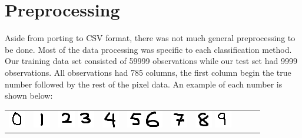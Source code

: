 \documentclass[10pt]{extarticle}
\begin{document}
\section{Preprocessing}

Aside from porting to CSV format, there was not much general preprocessing to be done. Most of the data processing was specific to each classification method. Our training data set consisted of 59999 observations while our test set had 9999 observations. All observations had 785 columns, the first column begin the true number followed by the rest of the pixel data. An example of each number is shown below:
\begin{center}
	\begin{tabular}{c c c c c c c c c c}
		\includegraphics{zero.png} & \includegraphics{one.png} & \includegraphics{two.png} 
		\includegraphics{three.png} & \includegraphics{four.png} & \includegraphics{five.png} 
		\includegraphics{six.png} &\includegraphics{seven.png} &\includegraphics{eight.png} 
		\includegraphics{nine.png}
	\end{tabular} 
\end{center}
\end{document}
